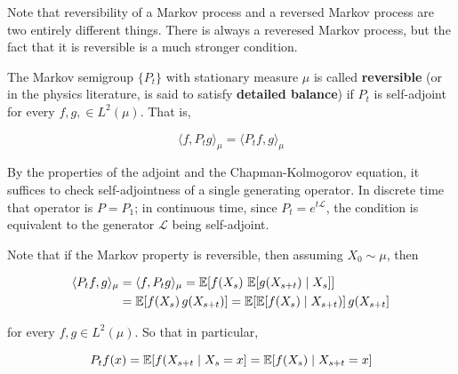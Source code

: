 	Note that reversibility of a Markov process and a reversed Markov process are two entirely different things. There is always a reveresed Markov process, but the fact that it is reversible is a much stronger condition. 

	\begin{definition}[Reversibility]
		\label{def:reversibility}
		The Markov semigroup $\{P_t\}$ with stationary measure $\mu$ is called \textbf{reversible} (or in the physics literature, is said to satisfy \textbf{detailed balance}) if $P_t$ is self-adjoint for every $f, g, \in L^2 (\mu)$. That is, 

			\begin{equation}
				\langle f, P_t g \rangle_\mu = \langle P_t f, g \rangle_\mu
			\end{equation}

		By the properties of the adjoint and the Chapman-Kolmogorov equation, it suffices to check self-adjointness of a single generating operator. In discrete time that operator is $P = P_1$; in continuous time, since $P_t = e^{t \mathscr{L}}$, the condition is equivalent to the generator $\mathscr{L}$ being self-adjoint. 
	\end{definition}

	Note that if the Markov property is reversible, then assuming $X_0 \sim \mu$, then 

	\begin{align*}
		\langle P_t f, g \rangle_\mu & = \langle f, P_t g \rangle_\mu = \operatorname{\mathbb{E}}[ f(X_s) \, \operatorname{\mathbb{E}}[g(X_{s + t}) \mid X_s]] \\
		& = \operatorname{\mathbb{E}}[ f(X_s) \, g(X_{s + t})] = \operatorname{\mathbb{E}}[ \operatorname{\mathbb{E}}[ f(X_s) \mid X_{s + t})] \, g(X_{s + t}] 
	\end{align*}

	for every $f, g \in L^2 (\mu)$. So that in particular, 

	\begin{equation}
		P_t f (x) = \operatorname{\mathbb{E}}[f(X_{s + t} \mid X_s = x] = \operatorname{\mathbb{E}}[f(X_s) \mid X_{s + t} = x]
	\end{equation}

